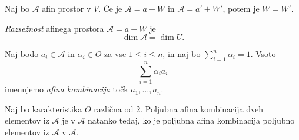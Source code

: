 \begin{posledica}
    Naj bo $\mathcal{A}$ afin prostor v $V$. Če je $\mathcal{A} = a + W$ in $\mathcal{A} = a' + W'$, potem je $W = W'$.
\end{posledica}

\begin{definicija}
    \emph{Razsežnost} afinega prostora $\mathcal{A} = a + W$ je 
    \[
    \dim \mathcal{A} = \dim U.
    \]
\end{definicija}

\begin{definicija}
    Naj bodo $a_{i} \in \mathcal{A}$ in $\alpha_{i} \in O$ za vse $1 \leq i \leq n$, in naj bo $\sum_{i=1}^{n} \alpha_{i} = 1$. Vsoto 
    \[
    \sum_{i=1}^{n} \alpha_{i} a_{i}
    \]
    imenujemo \emph{afina kombinacija} točk $a_1,\dots, a_n$.
\end{definicija}

\begin{lema}
    Naj bo karakteristika $O$ različna od 2. Poljubna afina kombinacija dveh elementov iz $\mathcal{A}$ je v $\mathcal{A}$ natanko tedaj, ko je poljubna afina kombinacija poljubno elementov iz $\mathcal{A}$ v $\mathcal{A}$.
\end{lema}

